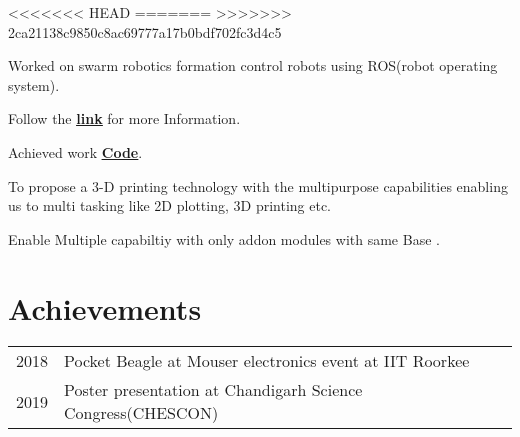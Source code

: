 \documentclass[]{font}
\begin{document}
\begin{minipage}[t]{0.64\textwidth}
<<<<<<< HEAD
=======
>>>>>>> 2ca21138c9850c8ac69777a17b0bdf702fc3d4c5
\begin{tightemize}
\item Worked on swarm robotics formation control robots using ROS(robot operating system).
\item Follow the \textbf{\href{http://crip.ml}{\underline{link}}} for more  Information.
\item Achieved work \textbf{\href{https://github.com/pranav083/ROS_work_earlier_nrf}{\underline{Code}}}.	
\end{tightemize}
\sectionsep

\begin{tightemize}
\item To propose a 3-D printing technology with the multipurpose
capabilities enabling us to multi tasking like 2D plotting, 3D printing etc.
\item Enable Multiple capabiltiy with only addon modules with same Base .
\end{tightemize}
\sectionsep


\section{Achievements} 
\begin{tabular}{rll}
2018	     & Pocket Beagle at Mouser electronics event at IIT Roorkee \\
2019	     & Poster presentation at Chandigarh Science Congress(CHESCON)\\
\end{tabular}
\sectionsep


\end{minipage}
\end{document}
